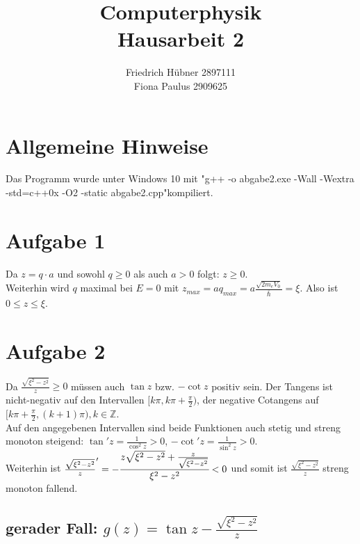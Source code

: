 \documentclass{scrartcl}
\author{Friedrich Hübner 2897111\\
Fiona Paulus 2909625}
\title{Computerphysik\\Hausarbeit 2}
\begin{document}
\maketitle
\newpage

\section*{Allgemeine Hinweise}
Das Programm wurde unter Windows 10 mit "g++ -o abgabe2.exe -Wall -Wextra -std=c++0x -O2 -static abgabe2.cpp"\;kompiliert.

\section*{Aufgabe 1}
Da $z = q \cdot a$ und sowohl $q\geq 0$ als auch $a > 0$ folgt: $z \geq 0$.\\
Weiterhin wird $q$ maximal bei $E = 0$ mit $z_{max} = a q_{max} = a\frac{\sqrt{2m_eV_0}}{\bar{\hslash}} = \xi$. Also ist $0 \leq z \leq \xi$.

\section*{Aufgabe 2}
Da $\frac{\sqrt{\xi^2-z^2}}{z} \geq 0$ müssen auch $\tan z$ bzw. $-\cot z$ positiv sein. Der Tangens ist nicht-negativ auf den Intervallen $[k\pi, k\pi+\frac{\pi}{2})$, der negative Cotangens auf $[k\pi+\frac{\pi}{2}, (k+1)\pi), k \in \mathbb{Z}$.\\
Auf den angegebenen Intervallen sind beide Funktionen auch stetig und streng monoton steigend: $\tan' z = \frac{1}{\cos^2 z} > 0$, $-\cot' z = \frac{1}{\sin^2 z} > 0$.\\
Weiterhin ist $\frac{\sqrt{\xi^2-z^2}}{z}' = -\cfrac{z\sqrt{\xi^2-z^2} + \frac{z}{\sqrt{\xi^2-z^2}}}{\xi^2-z^2} < 0$ und somit ist $\frac{\sqrt{\xi^2-z^2}}{z}$ streng monoton fallend.\\

\subsection*{gerader Fall: $g(z) = \tan z - \frac{\sqrt{\xi^2-z^2}}{z}$}
\end{document}
